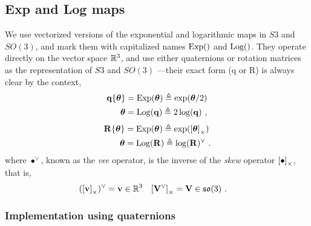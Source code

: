 \subsection{Exp and Log maps}

We use vectorized versions of the exponential and logarithmic maps in $S3$ and $SO(3)$, and mark them with capitalized names $\operatorname*{Exp}()$ and $\operatorname*{Log}()$. They operate directly on the vector space ${\mathbb R}^3$, and use either quaternions or rotation matrices as the representation of $S3$ and $SO(3)$ ---their exact form (q or R) is always clear by the context, 
%
\begin{subequations}
\begin{align}
{\bf q}\{{{\bm \theta}}\} &= \operatorname*{Exp}({{\bm \theta}}) \triangleq \exp({{\bm \theta}}/2)\\ 
{{\bm \theta}} &= \operatorname*{Log}({\bf q}) \triangleq 2\log({\bf q})
~,
\end{align}
\end{subequations}
%
\begin{subequations}
\begin{align}
{\bf R}\{{{\bm \theta}}\} &= \operatorname*{Exp}({{\bm \theta}}) \triangleq \exp(\left[{{\bm \theta}}\right]_\times) \\ 
{{\bm \theta}} &= \operatorname*{Log}({\bf R}) \triangleq \log({\bf R})^\vee 
~.
\end{align}
\end{subequations}
%
where $\bullet^\vee$, known as the \emph{vee} operator, is the inverse of the \emph{skew} operator $\left[\bullet\right]_\times$, that is, 
%
\begin{align*}
(\left[{\bf v}\right]_\times)^\vee &= {\bf v} \in {\mathbb R}^3 & \left[{\bf V}^\vee\right]_\times &= {\bf V} \in {\mathfrak {so}}(3)
~.
\end{align*}

\subsubsection{Implementation using quaternions}

